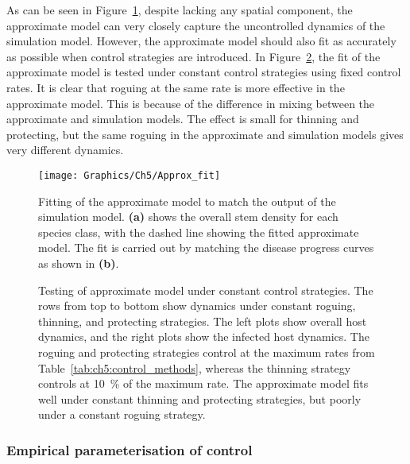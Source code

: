 As can be seen in Figure~\ref{fig:ch5:approx_fit}, despite lacking any spatial component, the approximate model can very closely capture the uncontrolled dynamics of the simulation model. However, the approximate model should also fit as accurately as possible when control strategies are introduced. In Figure~\ref{fig:ch5:fit_under_control}, the fit of the approximate model is tested under constant control strategies using fixed control rates. It is clear that roguing at the same rate is more effective in the approximate model. This is because of the difference in mixing between the approximate and simulation models. The effect is small for thinning and protecting, but the same roguing in the approximate and simulation models gives very different dynamics.

\begin{figure}
    \begin{center}
        \texttt{[image: Graphics/Ch5/Approx\_fit]}
        \caption[Fitting of approximate model]{Fitting of the approximate model to match the output of the simulation model. \textbf{(a)} shows the overall stem density for each species class, with the dashed line showing the fitted approximate model. The fit is carried out by matching the disease progress curves as shown in \textbf{(b)}\label{fig:ch5:approx_fit}.}
    \end{center}
\end{figure}

\begin{figure}
    \begin{center}
        \caption[Testing of approximate model under control]{Testing of approximate model under constant control strategies. The rows from top to bottom show dynamics under constant roguing, thinning, and protecting strategies. The left plots show overall host dynamics, and the right plots show the infected host dynamics. The roguing and protecting strategies control at the maximum rates from Table~\ref{tab:ch5:control_methods}, whereas the thinning strategy controls at \SI{10}{\percent} of the maximum rate. The approximate model fits well under constant thinning and protecting strategies, but poorly under a constant roguing strategy. \label{fig:ch5:fit_under_control}}
    \end{center}
\end{figure}

\subsubsection{Empirical parameterisation of control}


